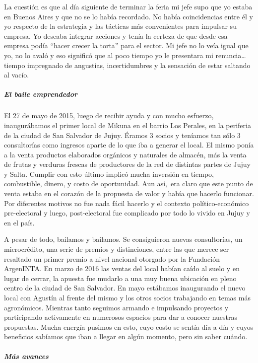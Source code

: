 \documentclass[
]{article}
\begin{document}
La cuestión es que al día siguiente de terminar la feria mi jefe supo
que yo estaba en Buenos Aires y que no se lo había recordado. No había
coincidencias entre él y yo respecto de la estrategia y las tácticas más
convenientes para impulsar su empresa. Yo deseaba integrar acciones y
tenía la certeza de que desde esa empresa podía ``hacer crecer la
torta'' para el sector. Mi jefe no lo veía igual que yo, no lo avaló y
eso significó que al poco tiempo yo le presentara mi renuncia\ldots{}
tiempo impregnado de angustias, incertidumbres y la sensación de estar
saltando al vacío.

\hypertarget{el-baile-emprendedor}{%
\subparagraph{El baile emprendedor}\label{el-baile-emprendedor}}

El 27 de mayo de 2015, luego de recibir ayuda y con mucho esfuerzo,
inaugurábamos el primer local de Mikuna en el barrio Los Perales, en la
periferia de la ciudad de San Salvador de Jujuy. Éramos 3 socios y
teníamos tan sólo 3 consultorías como ingresos aparte de lo que iba a
generar el local. El mismo ponía a la venta productos elaborados
orgánicos y naturales de almacén, más la venta de frutas y verduras
frescas de productores de la red de distintas partes de Jujuy y Salta.
Cumplir con esto último implicó mucha inversión en tiempo, combustible,
dinero, y costo de oportunidad. Aun así,~era claro que este punto de
venta estaba en el corazón de la propuesta de valor y había que hacerlo
funcionar. Por diferentes motivos no fue nada fácil hacerlo y el
contexto político-económico pre-electoral y luego, post-electoral fue
complicado por todo lo vivido en Jujuy y en el país.

A pesar de todo, bailamos y bailamos. Se consiguieron nuevas
consultorías, un microcrédito, una serie de premios y distinciones,
entre las que merece ser resaltado un primer premio a nivel nacional
otorgado por la Fundación ArgenINTA. En marzo de 2016 las ventas del
local habían caído al suelo y en lugar de cerrar, la apuesta fue mudarlo
a una muy buena ubicación en pleno centro de la ciudad de San Salvador.
En mayo estábamos inaugurando el nuevo local con Agustín al frente del
mismo y los otros socios trabajando en temas más agronómicos. Mientras
tanto seguimos armando e impulsando proyectos y participando activamente
en numerosos espacios para dar a conocer nuestras propuestas. Mucha
energía pusimos en esto, cuyo costo se sentía día a día y cuyos
beneficios sabíamos que iban a llegar en algún momento, pero sin saber
cuándo.

\hypertarget{muxe1s-avances}{%
\subparagraph{Más avances}\label{muxe1s-avances}}
\end{document}
